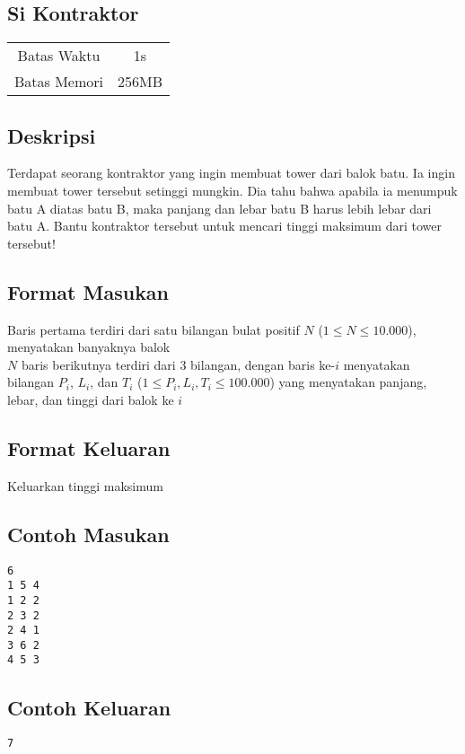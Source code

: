 \documentclass{article}
\begin{document}
\begin{center}

    
    \section*{Si Kontraktor} %

    \begin{tabular}{ | c c | }
        \hline
        Batas Waktu  & 1s \\    %
        Batas Memori & 256MB \\  %
        \hline
    \end{tabular}
\end{center}

\subsection*{Deskripsi}
Terdapat seorang kontraktor yang ingin membuat tower dari balok batu. Ia ingin membuat tower tersebut setinggi mungkin. Dia tahu bahwa apabila ia menumpuk batu A diatas batu B, maka panjang dan lebar batu B harus lebih lebar dari batu A. Bantu kontraktor tersebut untuk mencari tinggi maksimum dari tower tersebut!


\subsection*{Format Masukan}

Baris pertama terdiri dari satu bilangan bulat positif $N$ ($1 \leq N \leq 10.000$), menyatakan banyaknya balok\\
$N$ baris berikutnya terdiri dari 3 bilangan, dengan baris ke-$i$ menyatakan bilangan $P_i$, $L_i$, dan $T_i$ ($1 \leq P_i, L_i, T_i \leq 100.000$) yang menyatakan panjang, lebar, dan tinggi dari balok ke $i$ \\

\subsection*{Format Keluaran}

Keluarkan tinggi maksimum
\\

\begin{multicols}{2}
\subsection*{Contoh Masukan}
\begin{lstlisting}
6
1 5 4
1 2 2
2 3 2
2 4 1
3 6 2
4 5 3
\end{lstlisting}
\columnbreak
\subsection*{Contoh Keluaran}
\begin{lstlisting}
7
\end{lstlisting}
\vfill
\null
\end{multicols}
\end{document}
